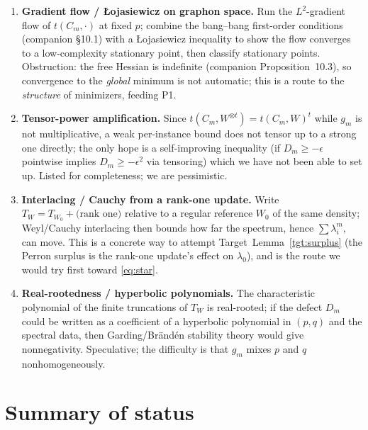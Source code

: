 \documentclass[11pt]{article}
\theoremstyle{definition}
\newcommand{\1}{\mathbf{1}}
\begin{document}
\begin{enumerate}[leftmargin=2em,label=\textbf{(F\arabic*)}]
\item \textbf{Gradient flow / {\L}ojasiewicz on graphon space.} Run the
$L^2$-gradient flow of $t(C_m,\cdot)$ at fixed $p$; combine the bang--bang
first-order conditions (companion \S10.1) with a {\L}ojasiewicz inequality to
show the flow converges to a low-complexity stationary point, then classify
stationary points. Obstruction: the free Hessian is indefinite (companion
Proposition~10.3), so convergence to the \emph{global} minimum is not automatic;
this is a route to the \emph{structure} of minimizers, feeding P1.
\item \textbf{Tensor-power amplification.} Since $t(C_m,W^{\otimes t})=
t(C_m,W)^t$ while $g_m$ is not multiplicative, a weak per-instance bound does not
tensor up to a strong one directly; the only hope is a self-improving inequality
(if $D_m\ge -\epsilon$ pointwise implies $D_m\ge -\epsilon^2$ via tensoring) which
we have not been able to set up. Listed for completeness; we are pessimistic.
\item \textbf{Interlacing / Cauchy from a rank-one update.} Write
$T_W=T_{W_0}+\text{(rank one)}$ relative to a regular reference $W_0$ of the same
density; Weyl/Cauchy interlacing then bounds how far the spectrum, hence
$\sum\lambda_i^m$, can move. This is a concrete way to attempt
Target~Lemma~\ref{tgt:surplus} (the Perron surplus is the rank-one update's
effect on $\lambda_0$), and is the route we would try first toward
\eqref{eq:star}.
\item \textbf{Real-rootedness / hyperbolic polynomials.} The characteristic
polynomial of the finite truncations of $T_W$ is real-rooted; if the defect
$D_m$ could be written as a coefficient of a hyperbolic polynomial in $(p,q)$ and
the spectral data, then Garding/Br\"and\'en stability theory would give
nonnegativity. Speculative; the difficulty is that $g_m$ mixes $p$ and $q$
nonhomogeneously.
\end{enumerate}

\section{Summary of status}\label{sec:status}
\end{document}
